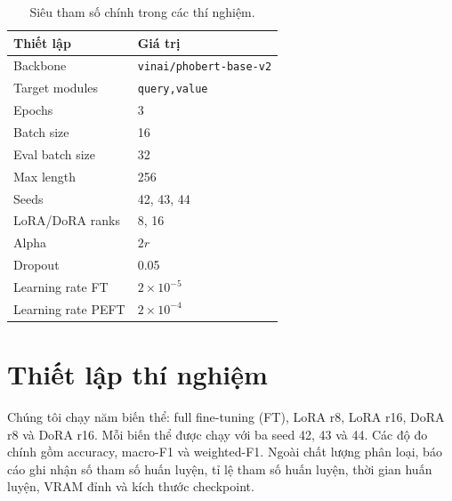 \documentclass{article}
\theoremstyle{plain}
\theoremstyle{definition}
\begin{document}
\begin{table}[t]
\caption{Khác biệt cài đặt giữa FT, LoRA và DoRA.}
\label{tab:implementation-modes}
\centering
{}
\end{table}

\begin{table}[t]
\caption{Siêu tham số chính trong các thí nghiệm.}
\label{tab:hyperparams}
\centering
\begin{tabular}{ll}
\toprule
Thiết lập & Giá trị \\
\midrule
Backbone & \texttt{vinai/phobert-base-v2} \\
Target modules & \texttt{query,value} \\
Epochs & 3 \\
Batch size & 16 \\
Eval batch size & 32 \\
Max length & 256 \\
Seeds & 42, 43, 44 \\
LoRA/DoRA ranks & 8, 16 \\
Alpha & $2r$ \\
Dropout & 0.05 \\
Learning rate FT & $2 \times 10^{-5}$ \\
Learning rate PEFT & $2 \times 10^{-4}$ \\
\bottomrule
\end{tabular}
\end{table}

\section{Thiết lập thí nghiệm}

Chúng tôi chạy năm biến thể: full fine-tuning (FT), LoRA r8, LoRA r16, DoRA r8 và DoRA r16. Mỗi biến thể được chạy với ba seed 42, 43 và 44. Các độ đo chính gồm accuracy, macro-F1 và weighted-F1. Ngoài chất lượng phân loại, báo cáo ghi nhận số tham số huấn luyện, tỉ lệ tham số huấn luyện, thời gian huấn luyện, VRAM đỉnh và kích thước checkpoint.
\end{document}

